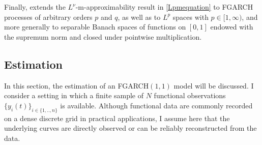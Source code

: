 \documentclass[12pt,a4paper]{article}
\theoremstyle{definition}
\begin{document}
Finally, \citet{Kuehnert2020} extends the $L^\nu$-m-approximability result in \cref{Lpmequation} to FGARCH processes of arbitrary orders $p$ and $q$, as well as to $L^p$ spaces with $p \in [1,\infty)$, and more generally to separable Banach spaces of functions on $[0,1]$ endowed with the supremum norm and closed under pointwise multiplication.
\subsection{Estimation}
\label{subsec:FGARCHEstimation}
In this section, the estimation of an FGARCH$(1,1)$ model will be discussed. I consider a setting in which a finite sample of $N$ functional observations $\{y_i(t)\}_{i\in\{1,..,n\}}$ is available. Although functional data are commonly recorded on a dense discrete grid in practical applications, I assume here that the underlying curves are directly observed or can be reliably reconstructed from the data.
\end{document}
